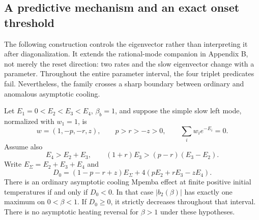 \subsection{A predictive mechanism and an exact onset threshold}\label{sec:mechanism}
The following construction controls the eigenvector rather than interpreting it after diagonalization. It extends the rational-mode companion in Appendix B, not merely the reset direction: two rates and the slow eigenvector change with a parameter. Throughout the entire parameter interval, the four triplet predicates fail. Nevertheless, the family crosses a sharp boundary between ordinary and anomalous asymptotic cooling.

\begin{lemma}\label{lem:singleturn}
Let $E_1=0<E_2<E_3<E_4$, $\beta_b=1$, and suppose the simple slow left mode, normalized with $w_1=1$, is
\[
w=(1,-p,-r,z),\qquad p>r>-z>0,\qquad \sum_iw_i e^{-E_i}=0.
\]
Assume also
\[
E_4>E_2+E_3,\qquad (1+r)E_3>(p-r)(E_3-E_2).
\]
Write $E_\Sigma=E_2+E_3+E_4$ and
\[
D_0=(1-p-r+z)E_\Sigma+4(pE_2+rE_3-zE_4).
\]
There is an ordinary asymptotic cooling Mpemba effect at finite positive initial temperatures if and only if $D_0<0$. In that case $|b_2(\beta)|$ has exactly one maximum on $0<\beta<1$. If $D_0\geq0$, it strictly decreases throughout that interval. There is no asymptotic heating reversal for $\beta>1$ under these hypotheses.
\end{lemma}
